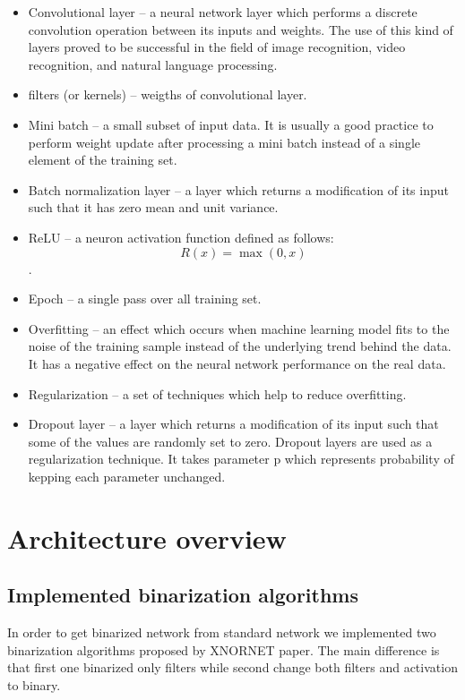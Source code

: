 \documentclass[licencjacka]{pracamgr}
\begin{document}
\begin{itemize}
        \item Convolutional layer -- a neural network layer which performs a discrete convolution operation between its inputs and weights. The use of this kind of layers proved to be successful in the field of image recognition, video recognition, and natural language processing. 	
         
        \item filters (or kernels) -- weigths of convolutional layer.

        \item Mini batch -- a small subset of input data. It is usually a good practice to perform weight update after processing a mini batch instead of a single element of the training set.
        
        \item Batch normalization layer -- a layer which returns a modification of its input such 
        that it has zero mean and unit variance.
        
        \item ReLU -- a neuron activation function defined as follows: $$ R(x) = \max(0,x) $$.
        
        \item Epoch -- a single pass over all training set.
        
        \item Overfitting -- an effect which occurs when machine learning model fits to the noise of the training sample instead of the underlying trend behind the data. It has a negative effect on the neural network performance on the real data.
        
        \item Regularization -- a set of techniques which help to reduce overfitting.
        
        \item Dropout layer -- a layer which returns a modification of its input such that some of the values are randomly set to zero. Dropout layers are used as a regularization technique. It takes parameter p which represents probability of kepping each parameter unchanged.  
    \end{itemize}

\part{Architecture overview}
\chapter{Implemented binarization algorithms}
	In order to get binarized network from standard network we implemented two binarization algorithms proposed by XNORNET paper. The main difference is that first one binarized only filters while second change both filters and activation to binary. 
\end{document}
